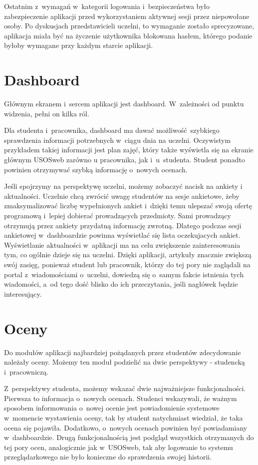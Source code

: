 \documentclass{pracamgr}
\begin{document}
Ostatnim z~wymagań w~kategorii logowania i~bezpieczeństwa było zabezpieczenie aplikacji
przed wykorzystaniem aktywnej sesji przez niepowołane osoby. Po dyskusjach przedstawicieli
uczelni, to wymaganie zostało sprecyzowane, aplikacja miała być na życzenie użytkownika
blokowana hasłem, którego podanie byłoby wymagane przy każdym starcie aplikacji.

\section{Dashboard}

Głównym ekranem i~sercem aplikacji jest dashboard. W~zależności od punktu widzenia, pełni
on kilka ról.

Dla studenta i~pracownika, dashboard ma dawać możliwość szybkiego sprawdzenia informacji
potrzebnych w~ciągu dnia na uczelni. Oczywistym przykładem takiej informacji jest plan zajęć,
który także wyświetla się na ekranie głównym USOSweb zarówno u pracownika, jak i~u~studenta.
Student ponadto powinien otrzymywać szybką informację o~nowych ocenach.

Jeśli spojrzymy na perspektywę uczelni, możemy zobaczyć nacisk na ankiety i aktualności.
Uczelnie chcą zwrócić uwagę studentów na sesje ankietowe, żeby zmaksymalizować liczbę
wypełnionych ankiet i~dzięki temu ulepszać swoją ofertę programową i~lepiej dobierać
prowadzących przedmioty. Sami prowadzący otrzymują przez ankiety przydatną informację zwrotną.
Dlatego podczas sesji ankietowej w~dashboardzie powinna wyświetlać się lista oczekujacych
ankiet. Wyświetlanie aktualności w~aplikacji ma na celu zwiększenie zainteresowania tym,
co ogólnie dzieje się na uczelni. Dzięki aplikacji, artykuły znacznie zwiększą swój zasięg,
ponieważ student lub pracownik, którzy do tej pory nie zaglądali na portal z~wiadomościami
o~uczelni, dowiedzą się o~samym fakcie istnienia tych wiadomości, a~od tego dość blisko do
ich przeczytania, jeśli nagłówek będzie interesujący.

\section{Oceny}

Do modułów aplikacji najbardziej pożądanych przez studentów zdecydowanie należały oceny.
Możemy ten moduł podzielić na dwie perspektywy - studencką i~pracowniczą.

Z~perspektywy studenta, możemy wskazać dwie najważniejsze funkcjonalności. Pierwsza to
informacja o~nowych ocenach. Studenci wskazywali, że ważnym sposobem informowania o~nowej
ocenie jest powiadomienie systemowe w~momencie wystawienia oceny, tak by student natychmiast
wiedział, że taka ocena się pojawiła. Dodatkowo, o~nowych ocenach powinien być powiadamiany
w~dashboardzie. Drugą funkcjonalnością jest podgląd wszystkich otrzymanych do tej pory ocen,
analogicznie jak w~USOSweb, tak aby logowanie to systemu przeglądarkowego nie było konieczne
do sprawdzenia swojej historii.
\end{document}
